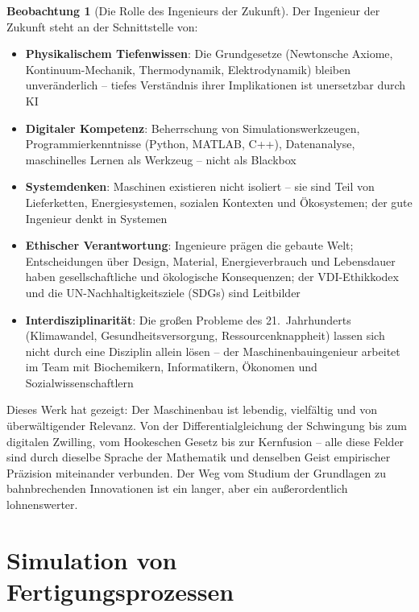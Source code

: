 ﻿\documentclass[a4paper,12pt]{report}
\theoremstyle{definition}
\newtheorem{beobachtung}{Beobachtung}
\begin{document}
\begin{beobachtung}[Die Rolle des Ingenieurs der Zukunft]
Der Ingenieur der Zukunft steht an der Schnittstelle von:
\begin{itemize}
    \item[-] \textbf{Physikalischem Tiefenwissen}: Die Grundgesetze
          (Newtonsche Axiome, Kontinuum-Mechanik, Thermodynamik, Elektrodynamik)
          bleiben unveränderlich -- tiefes Verständnis ihrer Implikationen
          ist unersetzbar durch KI
    \item[-] \textbf{Digitaler Kompetenz}: Beherrschung von Simulationswerkzeugen,
          Programmierkenntnisse (Python, MATLAB, C++), Datenanalyse,
          maschinelles Lernen als Werkzeug -- nicht als Blackbox
    \item[-] \textbf{Systemdenken}: Maschinen existieren nicht isoliert --
          sie sind Teil von Lieferketten, Energiesystemen, sozialen Kontexten
          und Ökosystemen; der gute Ingenieur denkt in Systemen
    \item[-] \textbf{Ethischer Verantwortung}: Ingenieure prägen die
          gebaute Welt; Entscheidungen über Design, Material, Energieverbrauch
          und Lebensdauer haben gesellschaftliche und ökologische Konsequenzen;
          der VDI-Ethikkodex und die UN-Nachhaltigkeitsziele (SDGs) sind Leitbilder
    \item[-] \textbf{Interdisziplinarität}: Die großen Probleme des 21.\ Jahrhunderts
          (Klimawandel, Gesundheitsversorgung, Ressourcenknappheit) lassen sich
          nicht durch eine Disziplin allein lösen -- der Maschinenbauingenieur
          arbeitet im Team mit Biochemikern, Informatikern, Ökonomen und Sozialwissenschaftlern
\end{itemize}

\medskip
Dieses Werk hat gezeigt: Der Maschinenbau ist lebendig, vielfältig
und von überwältigender Relevanz. Von der Differentialgleichung
der Schwingung bis zum digitalen Zwilling, vom Hookeschen Gesetz
bis zur Kernfusion -- alle diese Felder sind durch dieselbe
Sprache der Mathematik und denselben Geist empirischer Präzision
miteinander verbunden. Der Weg vom Studium der Grundlagen
zu bahnbrechenden Innovationen ist ein langer, aber ein außerordentlich
lohnenswerter.
\end{beobachtung}


\section{Simulation von Fertigungsprozessen}
\end{document}
